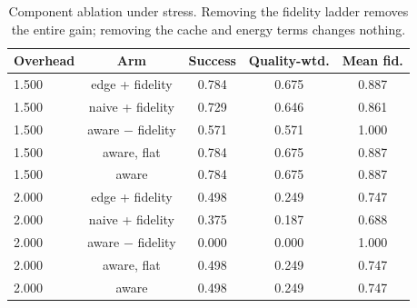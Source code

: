 \begin{table}[t]
\centering
\footnotesize
\caption{Component ablation under stress. Removing the fidelity ladder removes the entire gain; removing the cache and energy terms changes nothing.}
\label{tab:p2-ablation}
\begin{tabular}{lcccc}
\toprule
Overhead & Arm & Success & Quality-wtd. & Mean fid. \\
\midrule
1.500 & edge + fidelity & 0.784 & 0.675 & 0.887 \\
1.500 & naive + fidelity & 0.729 & 0.646 & 0.861 \\
1.500 & aware $-$ fidelity & 0.571 & 0.571 & 1.000 \\
1.500 & aware, flat & 0.784 & 0.675 & 0.887 \\
1.500 & aware & 0.784 & 0.675 & 0.887 \\
2.000 & edge + fidelity & 0.498 & 0.249 & 0.747 \\
2.000 & naive + fidelity & 0.375 & 0.187 & 0.688 \\
2.000 & aware $-$ fidelity & 0.000 & 0.000 & 1.000 \\
2.000 & aware, flat & 0.498 & 0.249 & 0.747 \\
2.000 & aware & 0.498 & 0.249 & 0.747 \\
\bottomrule
\end{tabular}
\par\vspace{2pt}{\footnotesize\raggedright aware\_nofid disables the ladder; aware\_flat sets the container penalty and the energy weight to zero. All arms use the same agentic workload and the same seeds.\par}
\end{table}
